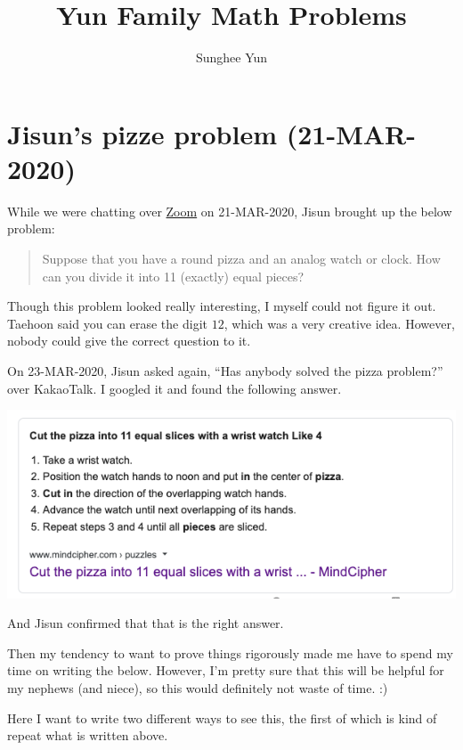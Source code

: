 \documentclass{article}
\title{Yun Family Math Problems}
\author{Sunghee Yun}
\begin{document}
\maketitle

\section{Jisun's pizze problem (21-MAR-2020)}

While we were chatting over \href{https://zoom.us/}{Zoom} on 21-MAR-2020,
Jisun brought up the below problem:
\begin{quote}
Suppose that you have a round pizza and an analog watch or clock.
How can you divide it into 11 (exactly) equal pieces?
\end{quote}
Though this problem looked really interesting,
I myself could not figure it out.
Taehoon said you can erase the digit $12$,
which was a very creative idea.
However, nobody could give the correct question to it.

On 23-MAR-2020, Jisun asked again, ``Has anybody solved the pizza problem?'' over KakaoTalk.
I googled it and found the following answer.

\begin{center}
\includegraphics[width=.7\linewidth]{figures/pizze_cut_prob_answer_by_googling}
\end{center}

And Jisun confirmed that that is the right answer.

Then my tendency to want to prove things rigorously
made me have to spend my time on writing the below.
However, I'm pretty sure that this will be helpful for my nephews (and niece),
so this would definitely not waste of time. :) 


Here I want to write two different ways to see this, the first of which is kind of repeat what is written above.
\end{document}
